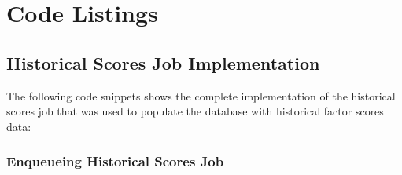 \documentclass[11pt,english,a4paper,hidelinks]{book}
\begin{document}
\chapter{Code Listings}
\section{Historical Scores Job Implementation}
\label{app:historical_scores_job}

\noindent The following code snippets shows the complete implementation of the historical scores job that was used to populate the database with historical factor scores data:

\subsection{Enqueueing Historical Scores Job}
\end{document}
